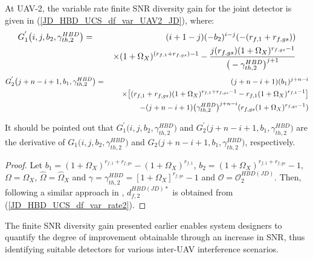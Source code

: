 \begin{proposition}
At UAV-2, the variable rate finite SNR diversity gain for the joint detector is given in (\ref{JD_HBD_UCS_df_var_UAV2_JD}), where:
\begin{eqnarray}
G_1^{'}\big(i,j,b_2,\gamma_{th,2}^{HBD}\big) & = & (i+1-j)(-b_2)^{i-j}(-(r_{f,1} + r_{f,gs})) \nonumber\\
& & \hspace{0.5cm} \times (1+\Omega_X)^{(r_{f,1} + r_{f,gs})-1} - \frac{j(r_{f,gs}) (1+\Omega_X)^{r_{f,gs}-1}}{\big(-\gamma_{th,2}^{HBD}\big)^{j+1}} \nonumber
\end{eqnarray}
\vspace{-0.75cm}
\begin{eqnarray}
G_2^{'}\big(j+n-i+1,b_1,\gamma_{th,2}^{HBD}\big) & = & (j+n-i+1)(b_1)^{j+n-i} \nonumber\\
& & \hspace{0.5cm} \times \big[(r_{f,1} + r_{f,gs})(1+\Omega_X)^{r_{f,1} + r_{f,gs}-1} - r_{f,1}(1+\Omega_X)^{r_{f,1}-1}\big] \nonumber\\
& & \hspace{1cm} - (j+n-i+1)\big(\gamma_{th,2}^{HBD}\big)^{j+n-i}(r_{f,gs}(1+\Omega_X)^{r_{f,gs}-1}) \nonumber
\end{eqnarray}

It should be pointed out that $G_1^{'}\big(i,j,b_2,\gamma_{th,2}^{HBD}\big)$ and $G_2^{'}\big(j+n-i+1,b_1,\gamma_{th,2}^{HBD}\big)$ are the derivative of $G_1\big(i,j,b_2,\gamma_{th,2}^{HBD}\big)$ and $G_2\big(j+n-i+1,b_1,\gamma_{th,2}^{HBD}\big)$, respectively.
\end{proposition}
\begin{proof}
Let $b_1 = (1+\Omega_X)^{r_{f,1}+r_{f,gs}} - (1+\Omega_X)^{r_{f,1}}$, $b_2 = (1+\Omega_X)^{r_{f,1}+r_{f,gs}} - 1$, $\Omega=\Omega_X$, $\widehat{\Omega}=\widehat{\Omega}_X$ and $\gamma=\gamma_{th,2}^{HBD}=[1+\Omega_X]^{r_{f,gs}}-1$ and $\mathcal{O} = \mathcal{O}_{2}^{HBD(JD)}$. Then, following a similar approach in \cite[eq. (35)]{ernest2019outage}, $d_{f,2}^{HBD(JD)*}$ is obtained from (\ref{JD_HBD_UCS_df_var_rate2}). 
\end{proof}

The finite SNR diversity gain presented earlier enables system designers to quantify the degree of improvement obtainable through an increase in SNR, thus identifying suitable detectors for various inter-UAV interference scenarios.

